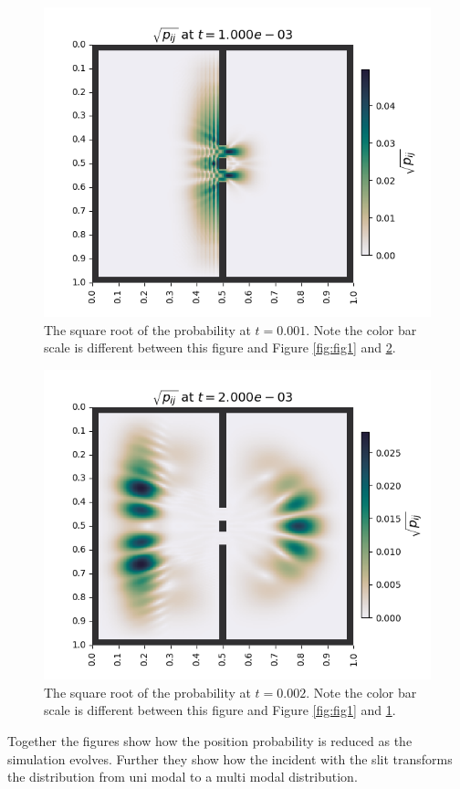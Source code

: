 \documentclass[../main_proj5.tex]{subfiles}
\begin{document}
\begin{figure}[htbp]
    \centering
    \includegraphics[width=.8\linewidth]{Project 5/figures/problem8and9_M201_Nslits2_sqrtpij_040.png}
    \caption{The square root of the probability at \( t = 0.001 \). Note the color bar scale is different between this figure and Figure \ref{fig:fig1} and \ref{fig:fig3}.}
    \label{fig:fig2}
\end{figure}

\begin{figure}[htbp]
    \centering
    \includegraphics[width=.8\linewidth]{Project 5/figures/problem8and9_M201_Nslits2_sqrtpij_080.png}
    \caption{The square root of the probability at \( t = 0.002 \). Note the color bar scale is different between this figure and Figure \ref{fig:fig1} and \ref{fig:fig2}.}
    \label{fig:fig3}
\end{figure}

Together the figures show how the position probability is reduced as the simulation evolves. Further they show how the incident with the slit transforms the distribution from uni modal to a multi modal distribution. 
\end{document}
